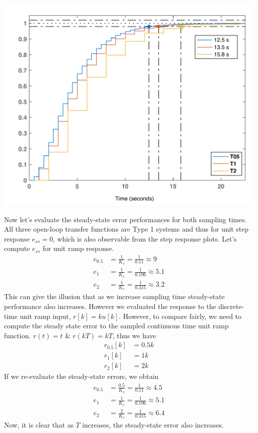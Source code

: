 \documentclass[twoside]{article}
\begin{document}
\begin{center}
\begin{minipage}[h]{\linewidth}
    \begin{center}
      \includegraphics[width=\textwidth]{stepComp}
    \end{center}
\end{minipage}
\end{center}

Now let's evaluate the steady-state error performances for both
sampling times. All three open-loop transfer functions are Type 1
systems and thus for unit step response $e_{ss} = 0$, which is also
observable from the step response plots. Let's compute $e_{ss}$
for unit ramp response.
%
\begin{align*}
  e_{0.5} &= \frac{1}{K_v} = \frac{1}{0.11} \approx 9 \\
  e_{1} &= \frac{1}{K_v} = \frac{1}{0.196} \approx 5.1 \\
  e_{2} &= \frac{1}{K_v} = \frac{1}{0.315} \approx 3.2
\end{align*}
%
This can give the illusion that as we increase sampling time steady-state performance also increases. However we evaluated the response to the discrete-time unit ramp input,  $r[k] = k u[k]$. However, to compare fairly, we need to compute the steady state error to the sampled continuous time unit ramp function.  $r(t) = t$ \& $r(kT) = kT$, thus we have
%
\begin{align*}
  r_{0.5}[k] &= 0.5 k \\
  r_{1}[k] &= 1 k \\
  r_{2}[k] &= 2 k
\end{align*}
%
If we re-evaluate the steady-state errors, we obtain
%
\begin{align*}
  e_{0.5} &= \frac{0.5}{K_v} = \frac{1}{0.11} \approx 4.5 \\
  e_{1} &= \frac{1}{K_v} = \frac{1}{0.196} \approx 5.1 \\
  e_{2} &= \frac{2}{K_v} = \frac{1}{0.315} \approx 6.4
\end{align*}
%
Now, it is clear that as $T$ increases, the steady-state error also increases. 
\end{document}
